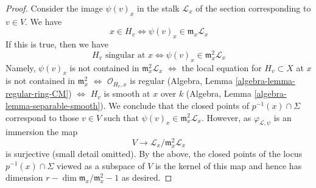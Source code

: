 \documentclass[10pt,a4paper]{amsart}
\theoremstyle{plain}
\theoremstyle{definition}
\theoremstyle{remark}
\numberwithin{equation}{subsection}
\begin{document}
\begin{proof}
\medskip\noindent
Consider the image $\psi(v)_x$ in the stalk $\mathcal{L}_x$
of the section corresponding to $v \in V$. We have
$$
x \in H_v \Leftrightarrow \psi(v)_x \in \mathfrak m_x\mathcal{L}_x
$$
If this is true, then we have
$$
H_v\text{ singular at }x \Leftrightarrow
\psi(v)_x \in \mathfrak m_x^2\mathcal{L}_x
$$
Namely, $\psi(v)_x$ is not contained in $\mathfrak m_x^2\mathcal{L}_x$
$\Leftrightarrow$
the local equation for $H_v \subset X$ at $x$ is not contained
in $\mathfrak m_x^2$
$\Leftrightarrow$
$\mathcal{O}_{H_v, x}$ is regular
(Algebra, Lemma \ref{algebra-lemma-regular-ring-CM})
$\Leftrightarrow$
$H_v$ is smooth at $x$ over $k$
(Algebra, Lemma \ref{algebra-lemma-separable-smooth}).
We conclude that the closed points of $p^{-1}(x) \cap \Sigma$ correspond
to those $v \in V$ such that $\psi(v)_x \in \mathfrak m_x^2\mathcal{L}_x$.
However, as $\varphi_{\mathcal{L}, \psi}$ is an immersion the
map
$$
V \longrightarrow \mathcal{L}_x/\mathfrak m_x^2\mathcal{L}_x
$$
is surjective (small detail omitted). By the above, the closed points
of the locus $p^{-1}(x) \cap \Sigma$ viewed as a subspace of $V$
is the kernel of this map and hence has dimension
$r - \dim \mathfrak m_x/\mathfrak m_x^2 - 1$ as desired.
\end{proof}
\end{document}

